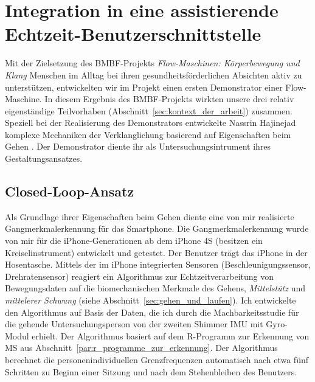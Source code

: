 

\chapter{Integration in eine assistierende Echtzeit-Benutzerschnittstelle} \label{cha:integration_in_eine_assistierende_echtzeit_benutzerschnittstelle}

Mit der Zielsetzung des \acs{BMBF}-Projekts \emph{Flow-Maschinen: Körperbewegung und Klang} Menschen im Alltag bei ihren gesundheitsförderlichen Absichten aktiv zu unterstützen, entwickelten wir im Projekt einen ersten Demonstrator einer Flow-Maschine. In diesem Ergebnis des \acs{BMBF}-Projekts wirkten unsere drei relativ eigenständige Teilvorhaben (Abschnitt~\ref{sec:kontext_der_arbeit}) zusammen. Speziell bei der Realisierung des Demonstrators entwickelte Nassrin Hajinejad komplexe Mechaniken der Verklanglichung basierend auf Eigenschaften beim Gehen \citep{Hajinejad2013, Hajinejad2015}. Der Demonstrator diente ihr als Untersuchungsintrument ihres Gestaltungsansatzes.

\section{Closed-Loop-Ansatz} 

\label{sec:closed_loop_ansatz}

Als Grundlage ihrer Eigenschaften beim Gehen diente eine von mir realisierte Gangmerkmalerkennung für das Smartphone. Die Gangmerkmalerkennung wurde von mir für die iPhone-Generationen ab dem iPhone 4S (besitzen ein Kreiselinstrument) entwickelt und getestet. Der Benutzer trägt das iPhone in der Hosentasche. Mittels der im iPhone integrierten Sensoren (Beschleunigungssensor, Drehratensensor) reagiert ein Algorithmus zur Echtzeitverarbeitung von Bewegungsdaten auf die biomechanischen Merkmale des Gehens, \emph{Mittelstütz} und \emph{mittelerer Schwung} (siehe Abschnitt~\ref{sec:gehen_und_laufen}). Ich entwickelte den Algorithmus auf Basis der Daten, die ich durch die Machbarkeitsstudie für die gehende Untersuchungsperson von der zweiten Shimmer \ac{IMU} mit Gyro-Modul erhielt. Der Algorithmus basiert auf dem R-Programm zur Erkennung von \ac{MS} aus Abschnitt~\ref{par:r_programme_zur_erkennung}. Der Algorithmus berechnet die personenindividuellen Grenzfrequenzen automatisch nach etwa fünf Schritten zu Beginn einer Sitzung und nach dem Stehenbleiben des Benutzers.


